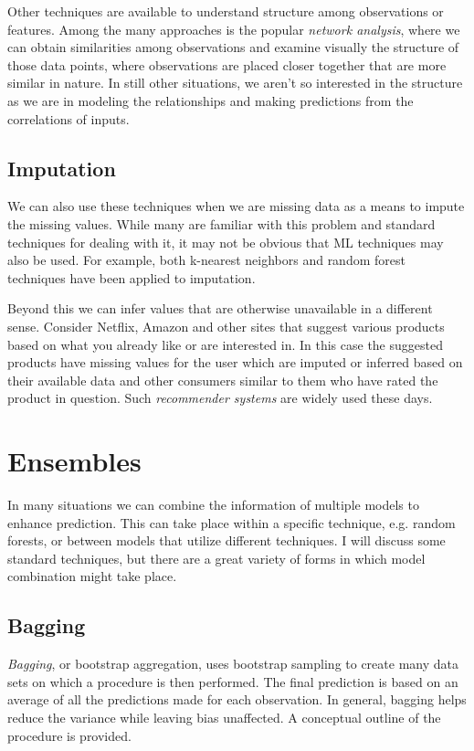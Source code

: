 \documentclass[english,nohyper,titlepage]{tufte-handout}\usepackage{knitr}
\begin{document}
Other techniques are available to understand structure among observations or features.  Among the many approaches is the popular \emph{network analysis}, where we can obtain similarities among observations and examine visually the structure of those data points, where observations are placed closer together that are more similar in nature. In still other situations, we aren't so interested in the structure as we are in modeling the relationships and making predictions from the correlations of inputs.

\subsection{Imputation}
We can also use these techniques when we are missing data as a means to impute the missing values.  While many are familiar with this problem and standard techniques for dealing with it, it may not be obvious that ML techniques may also be used.  For example, both k-nearest neighbors and random forest techniques have been applied to imputation. 

Beyond this we can infer values that are otherwise unavailable in a different sense.  Consider Netflix, Amazon and other sites that suggest various products based on what you already like or are interested in.  In this case the suggested products have missing values for the user which are imputed or inferred based on their available data and other consumers similar to them who have rated the product in question.  Such \emph{recommender systems} are widely used these days.

\section{Ensembles}
In many situations we can combine the information of multiple models to enhance prediction.  This can take place within a specific technique, e.g. random forests, or between models that utilize different techniques.  I will discuss some standard techniques, but there are a great variety of forms in which model combination might take place.

\subsection{Bagging}
\emph{Bagging}, or bootstrap aggregation, uses bootstrap sampling to create many data sets on which a procedure is then performed.  The final prediction is based on an average of all the predictions made for each observation.  In general, bagging helps reduce the variance while leaving bias unaffected. A conceptual outline of the procedure is provided.
\end{document}
